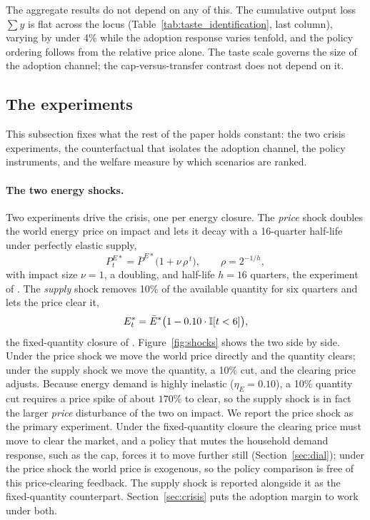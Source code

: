 The aggregate results do not depend on any of this. The cumulative output loss
$\sum y$ is flat across the locus (Table~\ref{tab:taste_identification}, last column),
varying by under 4\% while the adoption response varies tenfold, and the policy
ordering follows from the relative price alone. The taste scale governs the size of the adoption channel; the cap-versus-transfer
contrast does not depend on it.

\subsection{The experiments}
\label{sec:experiments}

This subsection fixes what the rest of the paper holds constant: the two crisis
experiments, the counterfactual that isolates the adoption channel, the policy
instruments, and the welfare measure by which scenarios are ranked.

\paragraph{The two energy shocks.}\label{sec:shocks}

Two experiments drive the crisis, one per energy closure. The \emph{price} shock
doubles the world energy price on impact and lets it decay with a 16-quarter
half-life under perfectly elastic supply,
%
\begin{equation}
P^{E*}_t=\bar P^{E*}\bigl(1+\nu\,\rho^{\,t}\bigr),
\qquad
\rho=2^{-1/h},
\label{eq:price-shock}
\end{equation}
%
with impact size $\nu=1$, a doubling, and half-life $h=16$ quarters, the experiment
of \citet{auclert2023energy}. The \emph{supply} shock removes 10\% of the
available quantity for six quarters and lets the price clear it,
%
\begin{equation}
E^{*}_t=\bar E^{*}\bigl(1-0.10\cdot\mathbb{I}[t<6]\bigr),
\label{eq:supply-shock}
\end{equation}
%
the fixed-quantity closure of \citet{bayer2026hank}. Figure~\ref{fig:shocks} shows the two side by side. Under the price shock we move
the world price directly and the quantity clears; under the supply shock we move
the quantity, a 10\% cut, and the clearing price adjusts. Because energy
demand is highly inelastic ($\eta_E=0.10$), a 10\% quantity cut requires a price
spike of about $170\%$ to clear, so the supply shock is in fact the larger
\emph{price} disturbance of the two on impact. We report the price shock as the primary experiment. Under the fixed-quantity closure
the clearing price must move to clear the market, and a policy that mutes the household
demand response, such as the cap, forces it to move further still
(Section~\ref{sec:dial}); under the price shock the world price is exogenous, so the
policy comparison is free of this price-clearing feedback. The supply shock is
reported alongside it as the fixed-quantity counterpart.
Section~\ref{sec:crisis} puts the adoption margin to work under both.

